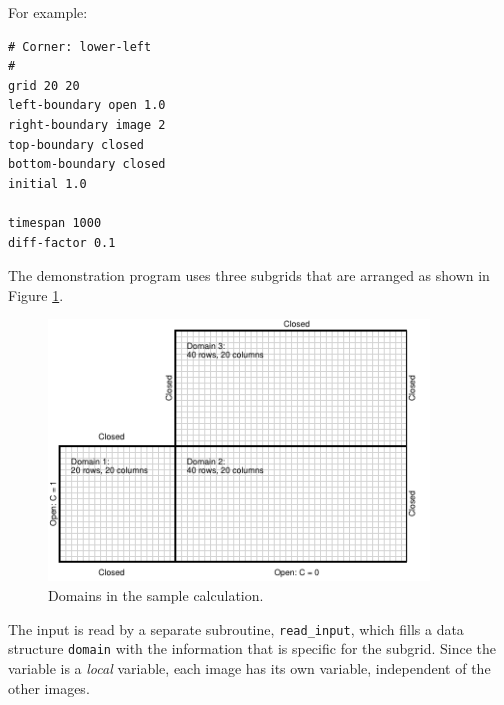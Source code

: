 \documentclass[onecolumn]{article}
\begin{document}
For example:

\begin{verbatim}
# Corner: lower-left
#
grid 20 20
left-boundary open 1.0
right-boundary image 2
top-boundary closed
bottom-boundary closed
initial 1.0

timespan 1000
diff-factor 0.1
\end{verbatim}

The demonstration program uses three subgrids that are arranged as shown in Figure \ref{domains}.

\begin{figure}[H]
\caption{Domains in the sample calculation.}
\label{domains}
\begin{center}
\includegraphics[width=0.9\textwidth]{diagram_domains.pdf}
\end{center}
\end{figure}

The input is read by a separate subroutine, \verb+read_input+, which fills a data structure \verb+domain+ with the information that is specific
for the subgrid. Since the variable is a \emph{local} variable, each image has its own variable, independent of the other images.
\end{document}
